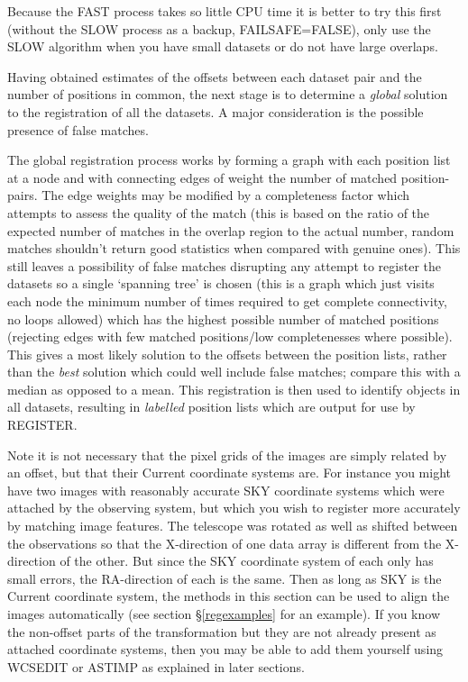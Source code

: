 \documentclass[twoside,11pt]{article}
\renewcommand{\_}{\texttt{\symbol{95}}}
\newcommand{\routine}[1]{{\sc #1}}
\begin{document}
Because the FAST process takes so little CPU time it is better to try
this first (without the SLOW process as a backup,
FAILSAFE=FALSE), only use the SLOW algorithm when you have
small datasets or do not have large overlaps.

Having obtained estimates of the offsets between each dataset pair and
the number of positions in common, the next stage is to determine a
{\em global} solution to the registration of all the datasets. A major
consideration is the possible presence of false matches.

The global registration process works by forming a graph with each
position list at a node and with connecting edges of weight the number
of matched  position-pairs. The edge weights may be modified by a
completeness factor which attempts to assess the quality of the match
(this is based on the ratio of the expected number of matches in the
overlap region to the actual number, random matches shouldn't return
good statistics when compared with genuine ones). This still leaves a
possibility of false matches disrupting any attempt to register the
datasets so a single `spanning tree' is chosen (this is a graph which
just visits each node the minimum number of times required to get
complete connectivity, no loops allowed) which has the highest possible
number of matched positions (rejecting edges with few matched
positions/low completenesses where possible). This gives a most likely
solution to the offsets between the position lists, rather than the
{\em best} solution which could well include false matches; compare this
with a median as opposed to a mean. This registration is then used to
identify objects in all datasets, resulting in {\em labelled} position
lists which are output for use by \routine{REGISTER}.

Note it is not necessary that the pixel grids of the images are simply 
related by an offset,
but that their Current coordinate systems are.
For instance you might have two images with reasonably accurate
SKY coordinate systems which were attached by the observing system,
but which you wish to register more accurately by matching image features.
The telescope was rotated as well as 
shifted between the observations so that the 
X-direction of one data array is different from the X-direction of
the other.  But since the SKY coordinate system of each only 
has small errors, the RA-direction of each is the same.
Then as long as SKY is the Current coordinate system,
the methods in this section can be used to align the images automatically
(see section \S\ref{regexamples} for an example).
If you know the non-offset parts of the transformation
but they are not already present as attached coordinate systems,
then you may be able to add them yourself using \routine{WCSEDIT} 
or \routine{ASTIMP} as explained in later sections.
\end{document}
